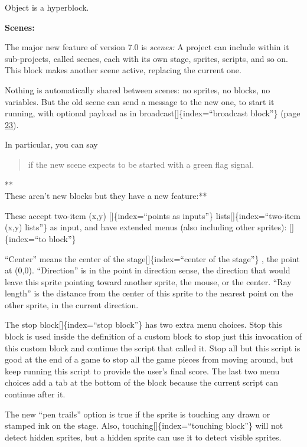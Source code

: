 \documentclass[
  letterpaper,
]{book}
\begin{document}
Object is a hyperblock.

\textbf{Scenes:}

The major new feature of version 7.0 is \emph{scenes:} A project can
include within it sub-projects, called scenes, each with its own stage,
sprites, scripts, and so on. This block makes another scene active,
replacing the current one.

Nothing is automatically shared between scenes: no sprites, no blocks,
no variables. But the old scene can send a message to the new one, to
start it running, with optional payload as in
broadcast{[}{]}\{index=``broadcast block''\} (page
\hyperref[broadcast]{23}).

In particular, you can say

\begin{quote}
if the new scene expects to be started with a green flag signal.
\end{quote}

**\\
These aren't new blocks but they have a new feature:**

These accept two-item (x,y) {[}{]}\{index=``points as inputs''\}
lists{[}{]}\{index=``two-item (x,y) lists''\} as input, and have
extended menus (also including other sprites): {[}{]}\{index=``to
block''\}

``Center'' means the center of the stage{[}{]}\{index=``center of the
stage''\} , the point at (0,0). ``Direction'' is in the point in
direction sense, the direction that would leave this sprite pointing
toward another sprite, the mouse, or the center. ``Ray length'' is the
distance from the center of this sprite to the nearest point on the
other sprite, in the current direction.

The stop block{[}{]}\{index=``stop block''\} has two extra menu choices.
Stop this block is used inside the definition of a custom block to stop
just this invocation of this custom block and continue the script that
called it. Stop all but this script is good at the end of a game to stop
all the game pieces from moving around, but keep running this script to
provide the user's final score. The last two menu choices add a tab at
the bottom of the block because the current script can continue after
it.

The new ``pen trails'' option is true if the sprite is touching any
drawn or stamped ink on the stage. Also,
touching{[}{]}\{index=``touching block''\} will not detect hidden
sprites, but a hidden sprite can use it to detect visible sprites.
\end{document}

